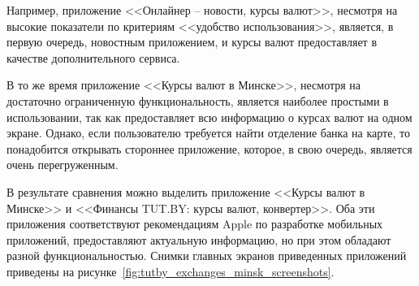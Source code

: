 Например, приложение <<Онлайнер -- новости, курсы валют>>, несмотря на высокие
показатели по критериям <<удобство использования>>, является, в первую очередь,
новостным приложением, и курсы валют предоставляет в качестве дополнительного сервиса.

В то же время приложение <<Курсы валют в Минске>>, несмотря на достаточно
ограниченную функциональность, является наиболее простыми в использовании, так как
предоставляет всю информацию о курсах валют на одном экране. Однако, если
пользователю требуется найти отделение банка на карте, то понадобится открывать
стороннее приложение, которое, в свою очередь, является очень перегруженным.

В результате сравнения можно выделить приложение <<Курсы валют
в Минске>> и <<Финансы TUT.BY: курсы валют, конвертер>>. Оба эти приложения
соответствуют рекомендациям Apple по разработке мобильных приложений,
предоставляют актуальную информацию, но при этом обладают
разной функциональностью.
Снимки главных экранов приведенных приложений приведены на рисунке~\ref{fig:tutby_exchanges_minsk_screenshots}.

